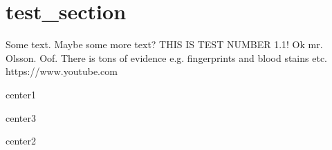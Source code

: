 \section{test_section} Some text. Maybe some more text? THIS IS TEST NUMBER 1.1! Ok mr. Olsson. 
Oof. There is tons of evidence e.g. fingerprints and blood stains etc. https://www.youtube.com
\begin{center}
center1
\begin{center}
\begin{center}
center3
\end{center}
center2
\end{center}
\end{center}